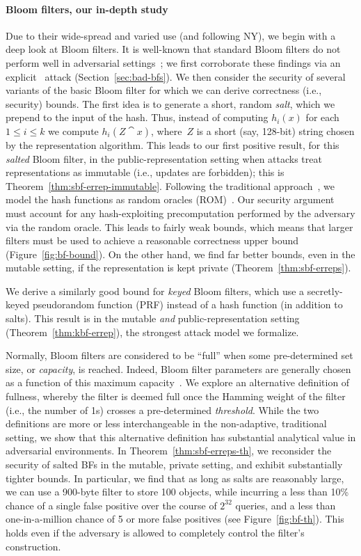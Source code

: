 \paragraph{Bloom filters, our in-depth study}
Due to their wide-spread and varied use (and following NY), we begin
with a deep look at Bloom filters.
%
It is well-known that standard Bloom filters do not perform well in adversarial
settings~\cite{naor2015bloom,gerbet2015power}; we first corroborate these
findings via an explicit \erreps\ attack (Section~\ref{sec:bad-bfs}).
%
We then consider the security of several variants of the basic Bloom
filter for which we can derive correctness (i.e., security) bounds.
%
The first idea is to generate a short, random \emph{salt}, which we prepend to
the input of the hash. Thus, instead of computing $h_i(x)$ for each $1\leq i
\leq k$ we compute $h_i(Z \cat x)$, where~$Z$ is a short (say, 128-bit) string
chosen by the representation algorithm.
%
This leads to our first positive result, for this \emph{salted} Bloom filter, in the
public-representation setting when attacks treat representations as
immutable (i.e., updates are forbidden); this is Theorem~\ref{thm:sbf-errep-immutable}.
%
Following the traditional approach~\cite{broder2004network}, we model
the hash functions as random oracles 
(ROM)~\cite{BR93}.  Our security argument must account for any hash-exploiting
precomputation performed by the adversary via the random oracle. This leads to
fairly weak bounds, which means that larger filters must be used to achieve a
reasonable correctness upper bound (Figure~\ref{fig:bf-bound}). 
%
On the other
hand, we find far better bounds, even in the mutable setting, if the
representation is kept private (Theorem~\ref{thm:sbf-erreps}). 

We derive a similarly good bound for \emph{keyed} Bloom filters, which use a
secretly-keyed pseudorandom function (PRF) instead of a hash function
(in addition to salts). This result is in the mutable \emph{and}
public-representation setting (Theorem~\ref{thm:kbf-errep}), the
strongest attack model we formalize.

Normally, Bloom filters are considered to be ``full'' when some
pre-determined set size, or
\emph{capacity}, is reached.  Indeed, Bloom filter parameters are generally chosen
as a function of this maximum capacity~\cite{kirsch2006less}.
%
We explore an alternative definition of fullness, whereby the filter is deemed full
once the Hamming weight of the filter (i.e., the number of 1s) crosses a
pre-determined \emph{threshold}.  While the two definitions are more or
less interchangeable in the non-adaptive, traditional setting, we show
that this alternative definition has substantial
analytical value in adversarial environments.  In
Theorem~\ref{thm:sbf-erreps-th}, we reconsider the security of salted
BFs in the mutable, private setting, and exhibit substantially tighter bounds. In
particular, we find that as long as salts are reasonably large, we can use
a 900-byte filter to store 100 objects, while incurring a less than 10\%
chance of a single false positive over the course of $2^{32}$ queries,
and a less than one-in-a-million chance of 5 or more
false positives (see Figure~\ref{fig:bf-th}).  This holds even if the adversary is allowed
to completely control the filter's construction.

